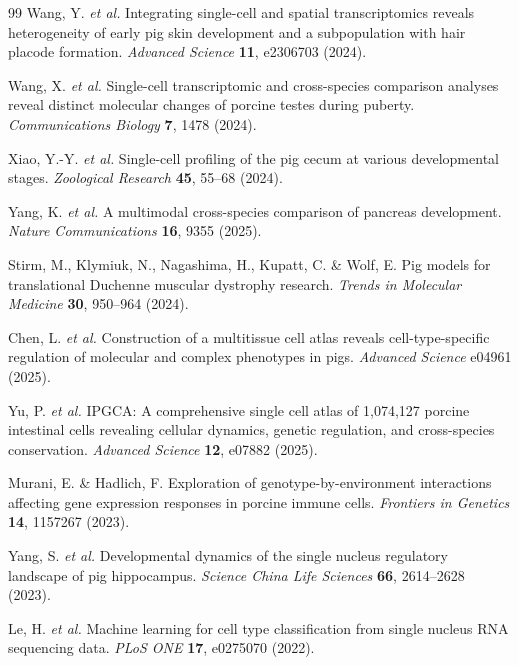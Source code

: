\begin{thebibliography}{99}
 Wang, Y. \textit{et al.} Integrating single-cell and spatial transcriptomics reveals heterogeneity of early pig skin development and a subpopulation with hair placode formation. \textit{Advanced Science} \textbf{11}, e2306703 (2024).

 Wang, X. \textit{et al.} Single-cell transcriptomic and cross-species comparison analyses reveal distinct molecular changes of porcine testes during puberty. \textit{Communications Biology} \textbf{7}, 1478 (2024).

 Xiao, Y.-Y. \textit{et al.} Single-cell profiling of the pig cecum at various developmental stages. \textit{Zoological Research} \textbf{45}, 55--68 (2024).

 Yang, K. \textit{et al.} A multimodal cross-species comparison of pancreas development. \textit{Nature Communications} \textbf{16}, 9355 (2025).

 Stirm, M., Klymiuk, N., Nagashima, H., Kupatt, C. \& Wolf, E. Pig models for translational Duchenne muscular dystrophy research. \textit{Trends in Molecular Medicine} \textbf{30}, 950--964 (2024).

 Chen, L. \textit{et al.} Construction of a multitissue cell atlas reveals cell-type-specific regulation of molecular and complex phenotypes in pigs. \textit{Advanced Science} e04961 (2025).

 Yu, P. \textit{et al.} IPGCA: A comprehensive single cell atlas of 1,074,127 porcine intestinal cells revealing cellular dynamics, genetic regulation, and cross-species conservation. \textit{Advanced Science} \textbf{12}, e07882 (2025).

 Murani, E. \& Hadlich, F. Exploration of genotype-by-environment interactions affecting gene expression responses in porcine immune cells. \textit{Frontiers in Genetics} \textbf{14}, 1157267 (2023).

 Yang, S. \textit{et al.} Developmental dynamics of the single nucleus regulatory landscape of pig hippocampus. \textit{Science China Life Sciences} \textbf{66}, 2614--2628 (2023).

 Le, H. \textit{et al.} Machine learning for cell type classification from single nucleus RNA sequencing data. \textit{PLoS ONE} \textbf{17}, e0275070 (2022).


\end{thebibliography}
